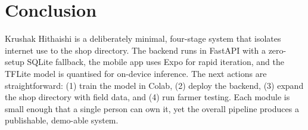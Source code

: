 \documentclass[11pt]{article}
\begin{document}
\section{Conclusion}
Krushak Hithaishi is a deliberately minimal, four-stage system that isolates internet use to the shop directory. The backend runs in FastAPI with a zero-setup SQLite fallback, the mobile app uses Expo for rapid iteration, and the TFLite model is quantised for on-device inference. The next actions are straightforward: (1) train the model in Colab, (2) deploy the backend, (3) expand the shop directory with field data, and (4) run farmer testing. Each module is small enough that a single person can own it, yet the overall pipeline produces a publishable, demo-able system.
\end{document}

